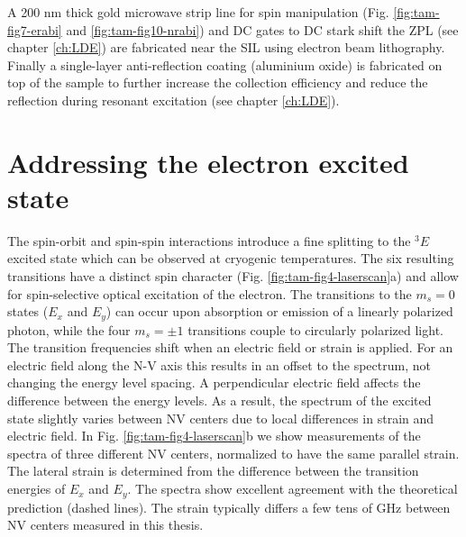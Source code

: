 A 200 nm thick gold microwave strip line for spin manipulation (Fig. \ref{fig:tam-fig7-erabi} and \ref{fig:tam-fig10-nrabi}) and DC gates to DC stark shift the ZPL (see chapter \ref{ch:LDE}) are  fabricated near the SIL using electron beam lithography. Finally a single-layer anti-reflection coating\cite{Yeung__2012} (aluminium oxide) is fabricated on top of the sample to further increase the collection efficiency and reduce the reflection during resonant excitation (see chapter \ref{ch:LDE}).

\section{Addressing the electron excited state}
\label{sec:opticalcontrol}

The spin-orbit and spin-spin interactions introduce a fine splitting to the $^3E$ excited state which can be observed at cryogenic temperatures. The six resulting transitions have a distinct spin character (Fig. \ref{fig:tam-fig4-laserscan}a) and allow for spin-selective optical excitation of the electron. The transitions to the $m_s = 0$ states ($E_x$ and $E_y$) can occur upon absorption or emission of a linearly polarized photon, while the four $m_s = \pm 1$ transitions couple to circularly polarized light. The transition frequencies shift when an electric field or strain is applied. For an electric field along the N-V axis this results in an offset to the spectrum, not changing the energy level spacing. A perpendicular electric field affects the difference between the energy levels. As a result, the spectrum of the excited state slightly varies between NV centers due to local differences in strain and electric field. In Fig. \ref{fig:tam-fig4-laserscan}b we show measurements of the spectra of three different NV centers, normalized to have the same parallel strain. The lateral strain is determined from the difference between the transition energies of $E_x$ and $E_y$. The spectra show excellent agreement with the theoretical prediction (dashed lines). The strain typically differs a few tens of GHz between NV centers measured in this thesis.

